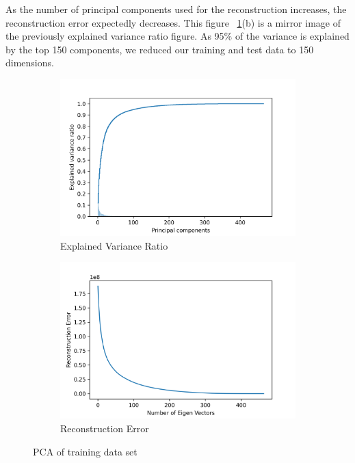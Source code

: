 \documentclass[a4paper,singleside,12pt]{report} %
\begin{document}
				As the number of principal components used for the reconstruction increases, the reconstruction error expectedly decreases. 
				This figure ~\ref{fig4.9}(b) is a mirror image of the previously explained variance ratio figure.
				As 95\% of the variance is explained by the top 150 components, we reduced our training and test data to 150 dimensions.
				
				\begin{figure}[h!]
				  \centering
				  \begin{subfigure}[b]{0.48\linewidth}
				    \includegraphics[width=\linewidth]{./figures/pca.explained_variance_ratio_.png}
				     \caption{Explained Variance Ratio}
				  \end{subfigure}
				  \begin{subfigure}[b]{0.48\linewidth}
				    \includegraphics[width=\linewidth]{./figures/pca.Reconstruction Error.png}
				    \caption{Reconstruction Error}
				  \end{subfigure}
				  \caption{PCA of training data set}
				  \label{fig4.9}
				\end{figure}
				
\end{document}
